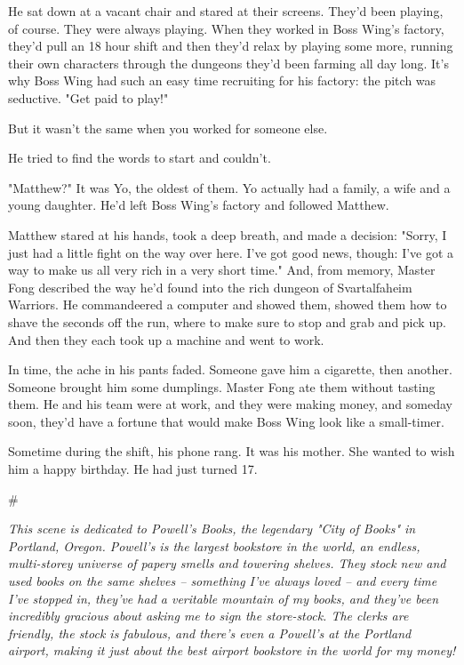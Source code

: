 He sat down at a vacant chair and stared at their screens. They'd
been playing, of course. They were always playing. When they worked
in Boss Wing's factory, they'd pull an 18 hour shift and then
they'd relax by playing some more, running their own characters
through the dungeons they'd been farming all day long. It's why
Boss Wing had such an easy time recruiting for his factory: the
pitch was seductive. "Get paid to play!"

But it wasn't the same when you worked for someone else.

He tried to find the words to start and couldn't.

"Matthew?" It was Yo, the oldest of them. Yo actually had a family,
a wife and a young daughter. He'd left Boss Wing's factory and
followed Matthew.

Matthew stared at his hands, took a deep breath, and made a
decision: "Sorry, I just had a little fight on the way over here.
I've got good news, though: I've got a way to make us all very rich
in a very short time." And, from memory, Master Fong described the
way he'd found into the rich dungeon of Svartalfaheim Warriors. He
commandeered a computer and showed them, showed them how to shave
the seconds off the run, where to make sure to stop and grab and
pick up. And then they each took up a machine and went to work.

In time, the ache in his pants faded. Someone gave him a cigarette,
then another. Someone brought him some dumplings. Master Fong ate
them without tasting them. He and his team were at work, and they
were making money, and someday soon, they'd have a fortune that
would make Boss Wing look like a small-timer.

Sometime during the shift, his phone rang. It was his mother. She
wanted to wish him a happy birthday. He had just turned 17.

\#

\emph{This scene is dedicated to Powell's Books, the legendary "City of Books" in Portland, Oregon. Powell's is the largest bookstore in the world, an endless, multi-storey universe of papery smells and towering shelves. They stock new and used books on the same shelves -- something I've always loved -- and every time I've stopped in, they've had a veritable mountain of my books, and they've been incredibly gracious about asking me to sign the store-stock. The clerks are friendly, the stock is fabulous, and there's even a Powell's at the Portland airport, making it just about the best airport bookstore in the world for my money!}

